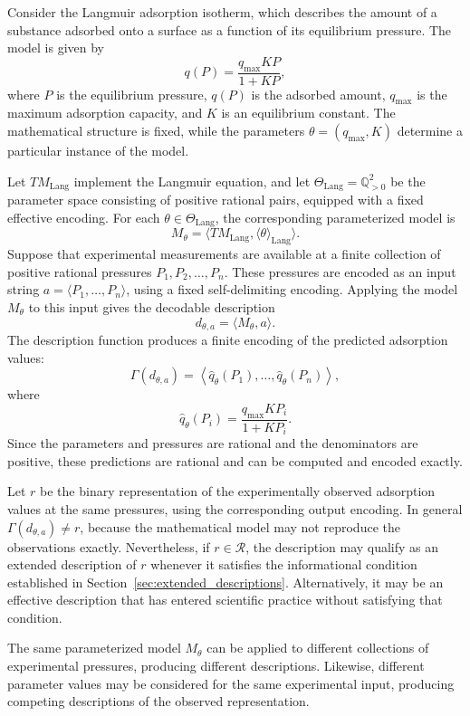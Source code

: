 \begin{example}
\label{ex:langmuir_model}
Consider the Langmuir adsorption isotherm, which describes the amount of a substance adsorbed onto a surface as a function of its equilibrium pressure. The model is given by
\[
q(P) = \frac{q_{\max}KP}{1+KP},
\]
where $P$ is the equilibrium pressure, $q(P)$ is the adsorbed amount, $q_{\max}$ is the maximum adsorption capacity, and $K$ is an equilibrium constant. The mathematical structure is fixed, while the parameters $\theta=(q_{\max},K)$ determine a particular instance of the model.

Let $TM_{\mathrm{Lang}}$ implement the Langmuir equation, and let $\Theta_{\mathrm{Lang}}=\mathbb{Q}_{>0}^2$ be the parameter space consisting of positive rational pairs, equipped with a fixed effective encoding. For each $\theta\in\Theta_{\mathrm{Lang}}$, the corresponding parameterized model is
\[
M_\theta
=
\langle
TM_{\mathrm{Lang}},
\langle\theta\rangle_{\mathrm{Lang}}
\rangle.
\]
Suppose that experimental measurements are available at a finite collection of positive rational pressures $P_1,P_2,\ldots,P_n$. These pressures are encoded as an input string $a=\langle P_1,\ldots,P_n\rangle$, using a fixed self-delimiting encoding. Applying the model $M_\theta$ to this input gives the decodable description
\[
d_{\theta,a} = \langle M_\theta,a\rangle.
\]
The description function produces a finite encoding of the predicted adsorption values:
\[
\Gamma(d_{\theta,a})
=
\left\langle
\hat q_\theta(P_1),
\ldots,
\hat q_\theta(P_n)
\right\rangle,
\]
where
\[
\hat q_\theta(P_i)
=
\frac{q_{\max}KP_i}{1+KP_i}.
\]
Since the parameters and pressures are rational and the denominators are positive, these predictions are rational and can be computed and encoded exactly.

Let $r$ be the binary representation of the experimentally observed adsorption values at the same pressures, using the corresponding output encoding. In general $\Gamma(d_{\theta,a})\neq r$, because the mathematical model may not reproduce the observations exactly. Nevertheless, if $r\in\mathcal{R}$, the description may qualify as an extended description of $r$ whenever it satisfies the informational condition established in Section~\ref{sec:extended_descriptions}. Alternatively, it may be an effective description that has entered scientific practice without satisfying that condition.

The same parameterized model $M_\theta$ can be applied to different collections of experimental pressures, producing different descriptions. Likewise, different parameter values may be considered for the same experimental input, producing competing descriptions of the observed representation.
\end{example}

